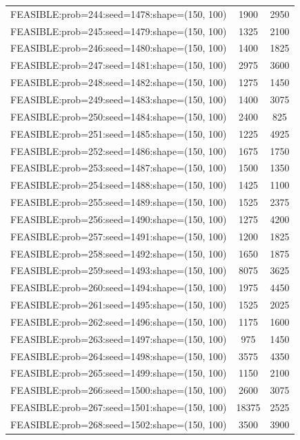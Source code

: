 \begin{longtable}{lcc}
FEASIBLE:prob=244:seed=1478:shape=(150, 100) &     1900 &  2950 \\
FEASIBLE:prob=245:seed=1479:shape=(150, 100) &     1325 &  2100 \\
FEASIBLE:prob=246:seed=1480:shape=(150, 100) &     1400 &  1825 \\
FEASIBLE:prob=247:seed=1481:shape=(150, 100) &     2975 &  3600 \\
FEASIBLE:prob=248:seed=1482:shape=(150, 100) &     1275 &  1450 \\
FEASIBLE:prob=249:seed=1483:shape=(150, 100) &     1400 &  3075 \\
FEASIBLE:prob=250:seed=1484:shape=(150, 100) &     2400 &   825 \\
FEASIBLE:prob=251:seed=1485:shape=(150, 100) &     1225 &  4925 \\
FEASIBLE:prob=252:seed=1486:shape=(150, 100) &     1675 &  1750 \\
FEASIBLE:prob=253:seed=1487:shape=(150, 100) &     1500 &  1350 \\
FEASIBLE:prob=254:seed=1488:shape=(150, 100) &     1425 &  1100 \\
FEASIBLE:prob=255:seed=1489:shape=(150, 100) &     1525 &  2375 \\
FEASIBLE:prob=256:seed=1490:shape=(150, 100) &     1275 &  4200 \\
FEASIBLE:prob=257:seed=1491:shape=(150, 100) &     1200 &  1825 \\
FEASIBLE:prob=258:seed=1492:shape=(150, 100) &     1650 &  1875 \\
FEASIBLE:prob=259:seed=1493:shape=(150, 100) &     8075 &  3625 \\
FEASIBLE:prob=260:seed=1494:shape=(150, 100) &     1975 &  4450 \\
FEASIBLE:prob=261:seed=1495:shape=(150, 100) &     1525 &  2025 \\
FEASIBLE:prob=262:seed=1496:shape=(150, 100) &     1175 &  1600 \\
FEASIBLE:prob=263:seed=1497:shape=(150, 100) &      975 &  1450 \\
FEASIBLE:prob=264:seed=1498:shape=(150, 100) &     3575 &  4350 \\
FEASIBLE:prob=265:seed=1499:shape=(150, 100) &     1150 &  2100 \\
FEASIBLE:prob=266:seed=1500:shape=(150, 100) &     2600 &  3075 \\
FEASIBLE:prob=267:seed=1501:shape=(150, 100) &    18375 &  2525 \\
FEASIBLE:prob=268:seed=1502:shape=(150, 100) &     3500 &  3900 \\

\end{longtable}
